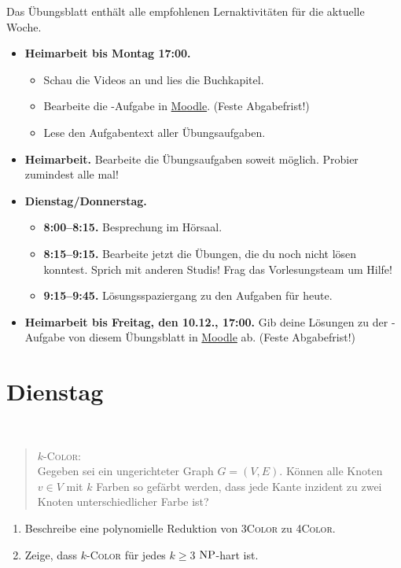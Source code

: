 \documentclass{uebung_cs}
\begin{document}
Das Übungsblatt enthält alle empfohlenen Lernaktivitäten für die aktuelle Woche.

\begin{itemize}
\item \textbf{Heimarbeit bis Montag 17:00.}
    \begin{itemize}
    \item 
    Schau die Videos an und lies die Buchkapitel.
    \item Bearbeite die -Aufgabe in \href{https://moodle.studiumdigitale.uni-frankfurt.de/moodle/course/view.php?id=2241}{Moodle}. (Feste Abgabefrist!)
    \item Lese den Aufgabentext aller Übungsaufgaben.
    \end{itemize}
\item \textbf{Heimarbeit.} Bearbeite die Übungsaufgaben soweit möglich. Probier zumindest alle mal!
\item \textbf{Dienstag/Donnerstag.}
\begin{itemize}
    \item \textbf{8:00--8:15.} Besprechung im Hörsaal.
    \item \textbf{8:15--9:15.} Bearbeite jetzt die Übungen, die du noch nicht lösen konntest. Sprich mit anderen Studis! Frag das Vorlesungsteam um Hilfe!
    \item \textbf{9:15--9:45.} Lösungsspaziergang zu den Aufgaben für heute.
\end{itemize}

\item \textbf{Heimarbeit bis Freitag, den 10.12., 17:00.} Gib deine Lösungen zu der -Aufgabe von diesem Übungsblatt in \href{https://moodle.studiumdigitale.uni-frankfurt.de/moodle/course/view.php?id=2241}{Moodle} ab. (Feste Abgabefrist!)
\end{itemize}

\section*{Dienstag}

\begin{aufgabe}[k-COLOR]\
	\begin{quote}
		$k$-\textsc{Color}:\\
		Gegeben sei ein ungerichteter Graph $G = (V,E)$. Können alle Knoten $v \in V$ mit $k$ Farben so gefärbt werden, dass jede Kante inzident zu zwei Knoten unterschiedlicher Farbe ist?
	\end{quote}
	\begin{enumerate}
		\item Beschreibe eine polynomielle Reduktion von \textsc{3Color} zu \textsc{4Color}.
		\item Zeige, dass $k$-\textsc{Color} für jedes $k \geq 3$ $\mathrm{NP}$-hart ist.
	\end{enumerate}
\end{aufgabe}
\end{document}
